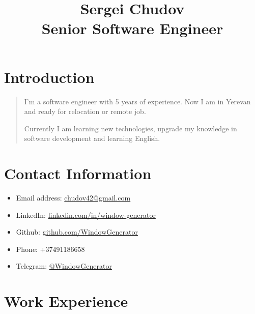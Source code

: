 \documentclass{article}
\begin{document}
\title{Sergei Chudov \\ \large Senior Software Engineer }
\author{}
\date{}
\maketitle

\section*{Introduction}
\begin{quote}
I'm a software engineer with 5 years of experience. Now I am in Yerevan and ready for relocation or remote job.

Currently I am learning new technologies, upgrade my knowledge in software development and learning English.
\end{quote}

\section*{Contact Information}
\begin{itemize}
    \item Email address: \href{mailto:chudov42@gmail.com}{chudov42@gmail.com}
    \item LinkedIn: \href{https://www.linkedin.com/in/window-generator}{linkedin.com/in/window-generator}
    \item Github: \href{https://github.com/WindowGenerator}{github.com/WindowGenerator}
    \item Phone: +37491186658
    \item Telegram: \href{https://t.me/WidowGenerator}{@WindowGenerator}
\end{itemize}

\section*{Work Experience}
\end{document}
